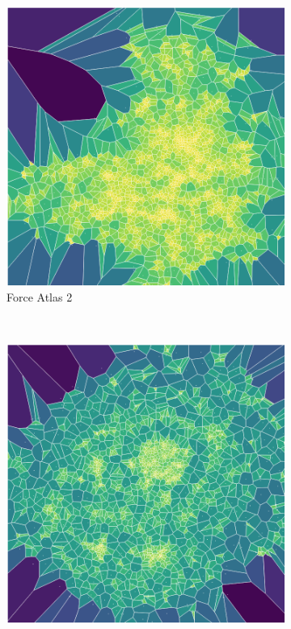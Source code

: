 \begin{figure}[H]
\begin{subfigure}[b]{.45\textwidth}
         \centering \includegraphics[width=\textwidth]{figures_c1/area/fill_fa_aphh.png}
         \caption{Force Atlas 2}
         \label{fig:afa}
         \end{subfigure}\\
     \begin{subfigure}[b]{.45\textwidth}
         \centering \includegraphics[width=\textwidth,angle=-90]{figures_c1/area/fill_tsnetloc.png}

\end{subfigure}
\end{figure}
